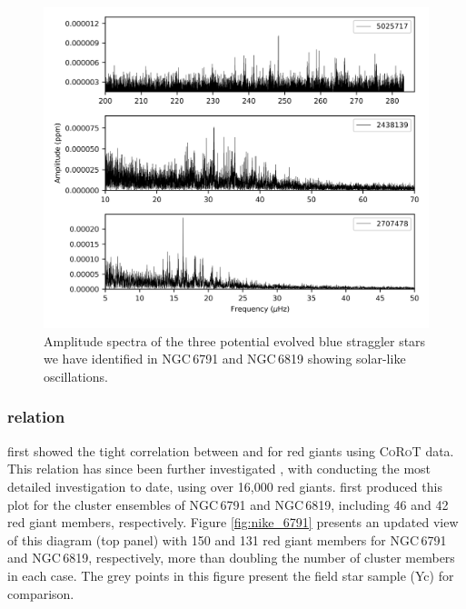 \begin{figure}
    \centering
    \includegraphics[width=0.95\linewidth]{Chapter5/ebss_ps.png}
    \caption[Amplitude spectra of three potential evolved blue straggler stars]{Amplitude spectra of the three potential evolved blue straggler stars we have identified in NGC\,6791 and NGC\,6819 showing solar-like oscillations.}
    \label{fig:ebss}
\end{figure}


\subsubsection{\numax{} \textendash \dnu{} relation}

\cite{hekker_characteristics_2009} first showed the tight correlation between \dnu{} and \numax{} for red giants using \textsc{CoRoT} data. This relation has since been further investigated \cite[eg.][]{stello_relation_2009, huber_testing_2011}, with \cite{yu_asteroseismology_2018-1} conducting the most detailed investigation to date, using over 16,000 red giants. \cite{ hekker_asteroseismic_2011} first produced this plot for the cluster ensembles of NGC\,6791 and NGC\,6819, including 46 and 42 red giant members, respectively. Figure \ref{fig:nike_6791} presents an updated view of this diagram (top panel) with 150 and 131 red giant members for NGC\,6791 and NGC\,6819, respectively, more than doubling the number of cluster members in each case. The grey points in this figure present the field star sample (Yc) for comparison. 

